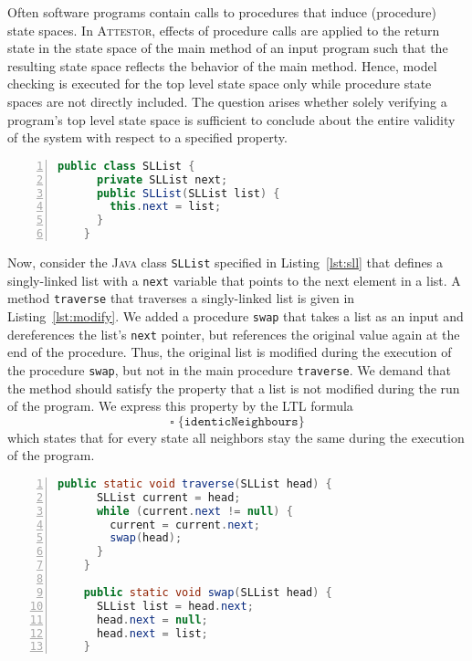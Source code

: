 \documentclass[a4paper, 12pt, twoside]{report}
\begin{document}
	Often software programs contain calls to procedures that induce (procedure) state spaces. In \textsc{Attestor}, effects of procedure calls are applied to the return state in the state space of the main method of an input program such that the resulting state space reflects the behavior of the main method. Hence, model checking is executed for the top level state space only while procedure state spaces are not directly included. The question arises whether solely verifying a program's top level state space is sufficient to conclude about the entire validity of the system with respect to a specified property.\\ 
	
	\begin{lstlisting}[language=Java,numbers=left,
	stepnumber=1,keywordstyle=\color{blue},frame=single,caption={\textsc{Java} class definition for singly-linked lists.},captionpos=b,label={lst:sll}]
	public class SLList {	
	  private SLList next;	  	
	  public SLList(SLList list) {	
	    this.next = list;
	  }
	}
	\end{lstlisting}	
	
	Now, consider the \textsc{Java} class \texttt{SLList} specified in Listing~\ref{lst:sll} that defines a singly-linked list with a \texttt{next} variable that points to the next element in a list. A method \texttt{traverse} that traverses a singly-linked list is given in Listing~\ref{lst:modify}. We added a procedure \texttt{swap} that takes a list as an input and dereferences the list's \texttt{next} pointer, but references the original value again at the end of the procedure. Thus, the original list is modified during the execution of the procedure \texttt{swap}, but not in the main procedure \texttt{traverse}. We demand that the method should satisfy the property that a list is not modified during the run of the program. We express this property by the LTL formula \[\square\;\{\texttt{identicNeighbours}\}\] which states that for every state all neighbors stay the same during the execution of the program.\\
	
	\begin{lstlisting}[language=Java,numbers=left,
	stepnumber=1,keywordstyle=\color{blue},frame=single,caption={\textsc{Java} code for traversing a singly-linked list that contains erroneous behaviour in a called procedure.},captionpos=b,label={lst:modify}]	  
	public static void traverse(SLList head) {	
	  SLList current = head;	
	  while (current.next != null) {
	    current = current.next;
	    swap(head);
	  }
	}
	
	public static void swap(SLList head) {	
	  SLList list = head.next;
	  head.next = null;
	  head.next = list;
	}	
	\end{lstlisting}
	
\end{document}
